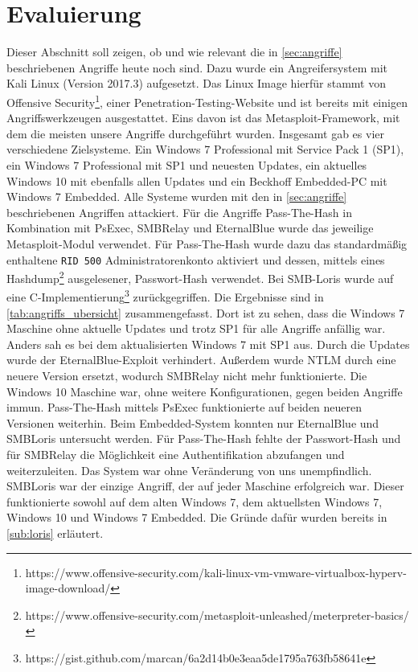 \documentclass{AIFB_ITI_Crypto_Seminar}
\begin{document}
\section{Evaluierung}
\label{sec:evaluierung}
Dieser Abschnitt soll zeigen, ob und wie relevant die in \autoref{sec:angriffe} beschriebenen Angriffe heute noch sind. Dazu wurde ein Angreifersystem mit Kali Linux (Version 2017.3) aufgesetzt. Das Linux Image hierfür stammt von Offensive Security\footnote{https://www.offensive-security.com/kali-linux-vm-vmware-virtualbox-hyperv-image-download/}, einer Penetration-Testing-Website und ist bereits mit einigen Angriffswerkzeugen ausgestattet. Eins davon ist das Metasploit-Framework, mit dem die meisten unsere Angriffe durchgeführt wurden. Insgesamt gab es vier verschiedene Zielsysteme. Ein Windows 7 Professional mit Service Pack 1 (SP1), ein Windows 7 Professional mit SP1 und neuesten Updates, ein aktuelles Windows 10 mit ebenfalls allen Updates und ein Beckhoff Embedded-PC mit Windows 7 Embedded. Alle Systeme wurden mit den in \autoref{sec:angriffe} beschriebenen Angriffen attackiert. Für die Angriffe Pass-The-Hash in Kombination mit PsExec, SMBRelay und EternalBlue wurde das jeweilige Metasploit-Modul verwendet. Für Pass-The-Hash wurde dazu das standardmäßig enthaltene \texttt{RID 500} Administratorenkonto aktiviert und dessen, mittels eines Hashdump\footnote{https://www.offensive-security.com/metasploit-unleashed/meterpreter-basics/} ausgelesener, Passwort-Hash verwendet. Bei SMB-Loris wurde auf eine C-Implementierung\footnote{https://gist.github.com/marcan/6a2d14b0e3eaa5de1795a763fb58641e} zurückgegriffen. Die Ergebnisse sind in \autoref{tab:angriffs_ubersicht} zusammengefasst. Dort ist zu sehen, dass die Windows 7 Maschine ohne aktuelle Updates und trotz SP1 für alle Angriffe anfällig war. Anders sah es bei dem aktualisierten Windows 7 mit SP1 aus. Durch die Updates wurde der EternalBlue-Exploit verhindert. Außerdem wurde NTLM durch eine neuere Version ersetzt, wodurch SMBRelay nicht mehr funktionierte. Die Windows 10 Maschine war, ohne weitere Konfigurationen, gegen beiden Angriffe immun. Pass-The-Hash mittels PsExec funktionierte auf beiden neueren Versionen weiterhin. Beim Embedded-System konnten nur EternalBlue und SMBLoris untersucht werden. Für Pass-The-Hash fehlte der Passwort-Hash und für SMBRelay die Möglichkeit eine Authentifikation abzufangen und weiterzuleiten. Das System war ohne Veränderung von uns unempfindlich. SMBLoris war der einzige Angriff, der auf jeder Maschine erfolgreich war. Dieser funktionierte sowohl auf dem alten Windows 7, dem aktuellsten Windows 7, Windows 10 und Windows 7 Embedded. Die Gründe dafür wurden bereits in \autoref{sub:loris} erläutert. \par
\end{document}
